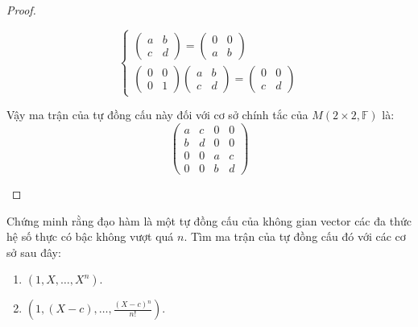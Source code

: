 \begin{proof}
\begin{enumerate}[label = (\alph*)]
\[\begin{cases}
                      \begin{pmatrix}
                          a & b \\
                          c & d
                      \end{pmatrix}=
                      \begin{pmatrix}
                          0 & 0 \\
                          a & b
                      \end{pmatrix} \\
                      \begin{pmatrix}
                          0 & 0 \\
                          0 & 1
                      \end{pmatrix}
                      \begin{pmatrix}
                          a & b \\
                          c & d
                      \end{pmatrix}=
                      \begin{pmatrix}
                          0 & 0 \\
                          c & d
                      \end{pmatrix}
                  \end{cases}
              \]
              
              Vậy ma trận của tự đồng cấu này đối với cơ sở chính tắc của $M(2\times 2,\mathbb{F})$ là:
              \[
                  \begin{pmatrix}
                      a & c & 0 & 0 \\
                      b & d & 0 & 0 \\
                      0 & 0 & a & c \\
                      0 & 0 & b & d
                  \end{pmatrix}
              \]
    \end{enumerate}
\end{proof}

\begin{exercise}
    Chứng minh rằng đạo hàm là một tự đồng cấu của không gian vector các đa thức hệ số thực có bậc không vượt quá $n$. Tìm ma trận của tự đồng cấu đó với các cơ sở sau đây:
    \begin{enumerate}[label = (\alph*)]
        \item $(1, X, \ldots, X^{n})$.
        \item $(1, (X-c), \ldots, \frac{(X-c){}^{n}}{n!})$.
    \end{enumerate}
\end{exercise}

